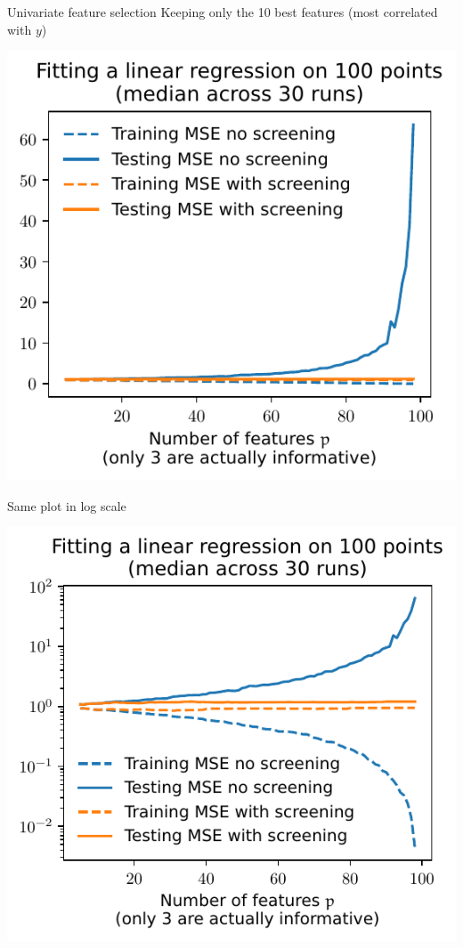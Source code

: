 \documentclass[presentation,mathserif,table]{beamer}
\begin{document}
\begin{frame}[label={sec:org545687f}]{Univariate feature selection}
Keeping only the 10 best features (most correlated with \(y\))
\begin{center}
\includegraphics[height=.7\textheight]{figures/generated/ridge_overfitting/mse_with_dim_reduction.pdf}
\end{center}
\end{frame}

\begin{frame}[label={sec:org6964450}]{Same plot in log scale}
\begin{center}
\includegraphics[height=.7\textheight]{figures/generated/ridge_overfitting/mse_with_dim_reduction_log.pdf}
\end{center}
\end{frame}
\end{document}
